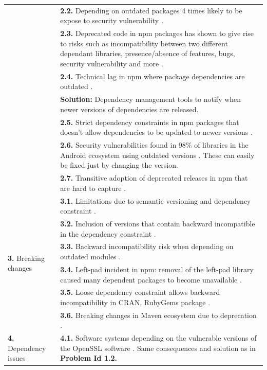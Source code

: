 \documentclass[conference]{IEEEtran}
\begin{document}
\begin{table}[!t]
\begin{tabular}{|p{3cm}|p{14cm}|}
					      & \textbf{2.2.} Depending on outdated packages 4 times likely to  be expose to security vulnerability \cite{cox2015measuring}.  \\	
					      & \textbf{2.3.} Deprecated code in npm packages has shown to give rise to risks such as incompatibility between two different dependant libraries, presence/absence of features, bugs, security vulnerability and more \cite{cogo2021deprecation}. \\
					      & \textbf{2.4.} Technical lag in npm where package dependencies are outdated \cite{decan2018evolution}.  \\
					      & \textbf{Solution:} Dependency management tools to notify when newer versions of dependencies are released.\\
					      & \textbf{2.5.} Strict dependency constraints in npm packages that doesn’t allow dependencies to be updated to newer versions \cite{decan2018evolution}.  \\
					      & \textbf{2.6.} Security vulnerabilities found in 98\% of libraries in the Android ecosystem using outdated versions \cite{decan2018evolution}. These can easily be fixed just by changing the version. \\
					      & \textbf{2.7.} Transitive adoption of deprecated releases in npm that are hard to capture \cite{cogo2021deprecation}.  \\
        \hline
        \multirow{6}{*}{\textbf{3.} Breaking changes} & \textbf{3.1.} Limitations due to semantic versioning and dependency constraint \cite{decan2018impact}. \\
						    & \textbf{3.2.} Inclusion of versions that contain backward incompatible in the dependency constraint \cite{decan2018impact}.  \\
						    &\textbf{3.3.} Backward incompatibility risk when depending on outdated modules \cite{decan2018impact}.  \\
						    & \textbf{3.4.} Left-pad incident in npm: removal of the left-pad library caused many dependent packages to become unavailable \cite{zimmermann2019small}. \\
						    & \textbf{3.5.} Loose dependency constraint allows backward incompatibility in CRAN, RubyGems package \cite{decan2018evolution}.\\
						   & \textbf{3.6.}  Breaking changes in Maven ecosystem due to deprecation \cite{decan2018evolution}.\\
       \hline
        \multirow{7}{*}{\textbf{4.} Dependency issues} & \textbf{4.1.} Software systems depending on the vulnerable versions of the  OpenSSL software \cite{decan2018impact} . Same consequences and solution as in \textbf{Problem Id 1.2.}\\

\end{tabular}
\end{table}
\end{document}
